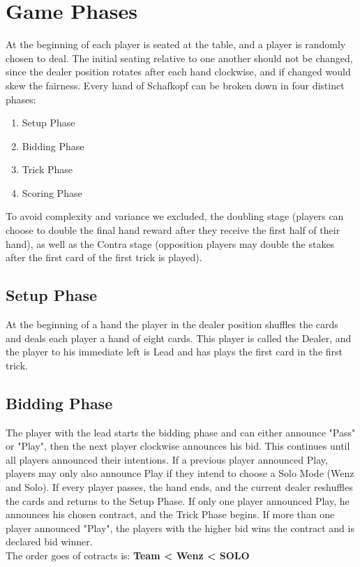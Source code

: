 \section{Game Phases}\label{gamephases}
At the beginning of each player is seated at the table, and a player is randomly chosen to deal.
The initial seating relative to one another should not be changed, since the dealer position rotates after each hand
clockwise, and if changed would skew the fairness.
\newline
Every hand of Schafkopf can be broken down in four distinct phases:
\begin{enumerate}
    \item Setup Phase
    \item Bidding Phase
    \item Trick Phase
    \item Scoring Phase
\end{enumerate}
To avoid complexity and variance we excluded, the doubling stage (players can choose to double the final hand reward
after they receive the first half of their hand), as well as the Contra stage (opposition players may double the
stakes after the first card of the first trick is played).

\subsection{Setup Phase}
At the beginning of a hand the player in the dealer position shuffles the cards and deals each player a hand of eight
cards.
This player is called the Dealer, and the player to his immediate left is Lead and has plays the first card in the
first trick.

\subsection{Bidding Phase}
The player with the lead starts the bidding phase and can either announce "Pass" or "Play", then the next player
clockwise announces his bid.
This continues until all players announced their intentions.
If a previous player announced Play, players may only also announce Play if they intend to choose a Solo Mode (Wenz
and Solo).
If every player passes, the hand ends, and the current dealer reshuffles the cards and returns to the Setup Phase.
If only one player announced Play, he announces his chosen contract, and the Trick Phase begins.
If more than one player announced "Play", the players with the higher bid wins the contract and is declared bid
winner.\\
The order goes of cotracts is: \textbf{Team < Wenz < SOLO}

